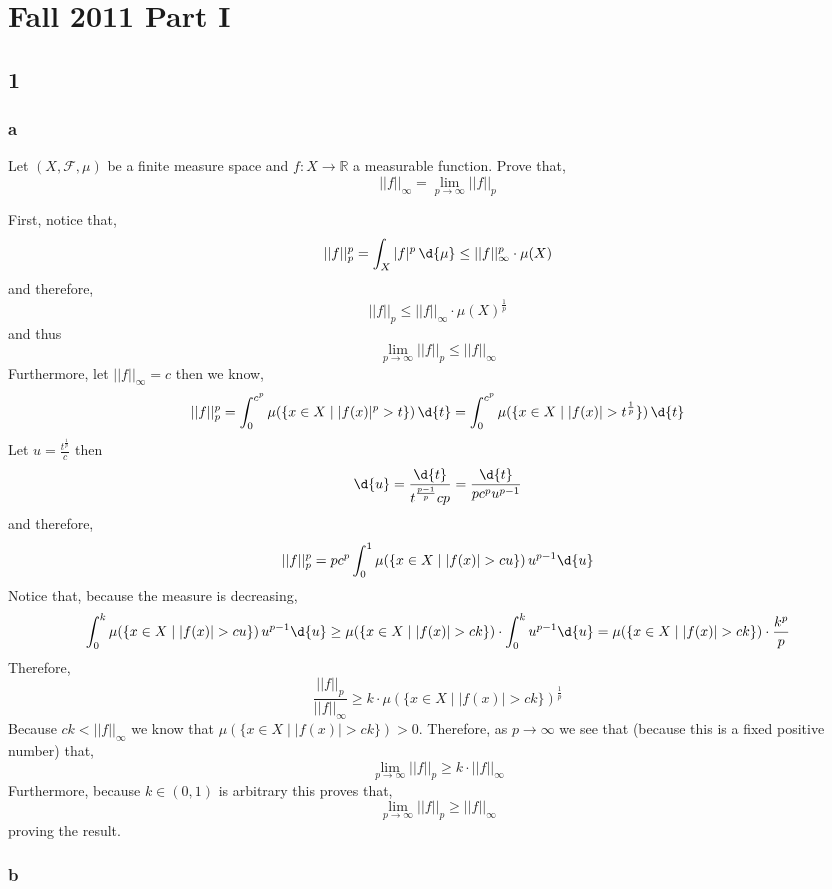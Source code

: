\documentclass[12pt]{article}
\newcommand{\R}{\mathbb{R}}
\renewcommand{\F}{\mathcal{F}}
\begin{document}
\section{Fall 2011 Part I}

\subsection{1}

\subsubsection{a}

\begin{exercise}
Let $(X, \F, \mu)$ be a finite measure space and $f : X \to \R$ a measurable function. Prove that,
\[ || f ||_{\infty} = \lim_{p \to \infty} || f ||_p \]
\end{exercise}
First, notice that,
\[ || f ||_p^p = \int_X |f|^p \, \d{\mu} \le || f ||_{\infty}^p \cdot \mu(X) \]
and therefore,
\[ || f ||_p \le || f ||_\infty \cdot \mu(X)^{\frac{1}{p}} \]
and thus
\[ \lim_{p \to \infty} || f ||_p \le || f ||_{\infty} \]
Furthermore, let $|| f ||_{\infty} = c$ then we know,
\[ || f ||_p^p = \int_0^{c^p} \mu(\{ x \in X \mid | f(x) |^p > t \}) \, \d{t} = \int_0^{c^p} \mu(\{ x \in X \mid |f(x)| > t^{\frac{1}{p}} \}) \, \d{t} \]
Let $u = \frac{t^{\frac{1}{p}}}{c}$ then
\[ \d{u} = \frac{\d{t}}{t^{\frac{p-1}{p}} cp} = \frac{\d{t}}{p c^p u^{p-1}} \]
and therefore,
\[ || f ||^p_p = p c^p \int_0^1 \mu(\{ x \in X \mid |f(x)| > cu \}) \, u^{p - 1} \d{u}  \]
Notice that, because the measure is decreasing,
\[ \int_0^k \mu(\{ x \in X \mid |f(x)| > cu \}) \, u^{p - 1} \d{u} \ge \mu(\{ x \in X \mid |f(x)| > ck \}) \cdot \int_0^k u^{p-1} \d{u} = \mu(\{ x \in X \mid |f(x)| > ck \}) \cdot \frac{k^p}{p} \]
Therefore,
\[ \frac{|| f ||_p}{|| f ||_{\infty}} \ge k \cdot \mu(\{ x \in X \mid |f(x)| > ck \})^{\frac{1}{p}} \]
Because $ck < || f ||_{\infty}$ we know that $\mu(\{ x \in X \mid |f(x)| > ck \}) > 0$. Therefore, as $p \to \infty$ we see that (because this is a fixed positive number) that,
\[ \lim_{p \to \infty} || f ||_p \ge k \cdot || f ||_{\infty} \]
Furthermore, because $k \in (0, 1)$ is arbitrary this proves that,
\[ \lim_{p \to \infty} || f ||_p \ge || f ||_{\infty} \]
proving the result.

\subsubsection{b}
\end{document}
